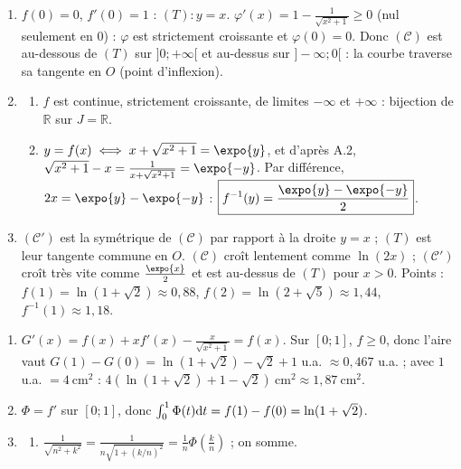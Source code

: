 \begin{corrige}
\begin{sol}
\begin{description}
\begin{enumerate}
\begin{enumerate}
            \end{enumerate}
      \item $f(0) = 0$, $f'(0) = 1$ : $\boxed{(T) : y = x}$. $\varphi'(x) = 1 - \frac{1}{\sqrt{x^2+1}} \geq 0$ (nul seulement en $0$) :
            $\varphi$ est strictement croissante et $\varphi(0) = 0$. Donc $(\mathscr{C})$ est au-dessous de $(T)$ sur $]0 ; +\infty[$ et
            au-dessus sur $]-\infty ; 0[$ : la courbe traverse sa tangente en $O$ (point d'inflexion).
      \item \begin{enumerate}
            \item $f$ est continue, strictement croissante, de limites $-\infty$ et $+\infty$ : bijection de $\mathbb{R}$ sur $\boxed{J = \mathbb{R}}$.
            \item $y = f(x) \iff x + \sqrt{x^2+1} = \expo{y}$, et d'apr\`es A.2, $\sqrt{x^2+1} - x = \frac{1}{x + \sqrt{x^2+1}} = \expo{-y}$.
                  Par diff\'erence, $2x = \expo{y} - \expo{-y}$ : $\boxed{f^{-1}(y) = \frac{\expo{y} - \expo{-y}}{2}}$.
            \end{enumerate}
      \item $(\mathscr{C}')$ est la sym\'etrique de $(\mathscr{C})$ par rapport \`a la droite $y = x$ ; $(T)$ est leur tangente commune
            en $O$. $(\mathscr{C})$ cro\^it lentement comme $\ln(2x)$ ; $(\mathscr{C}')$ cro\^it tr\`es vite comme $\frac{\expo{x}}{2}$ et
            est au-dessus de $(T)$ pour $x > 0$. Points : $f(1) = \ln(1 + \sqrt{2}) \approx 0{,}88$, $f(2) = \ln(2 + \sqrt{5}) \approx 1{,}44$,
            $f^{-1}(1) \approx 1{,}18$.
      \end{enumerate}
\item[Partie B.] \begin{enumerate}
      \item $G'(x) = f(x) + x f'(x) - \frac{x}{\sqrt{x^2+1}} = f(x)$. Sur $[0 ; 1]$, $f \geq 0$, donc l'aire vaut
            $G(1) - G(0) = \ln(1 + \sqrt{2}) - \sqrt{2} + 1$ u.a. $\approx 0{,}467$ u.a. ; avec $1$ u.a. $= 4~\text{cm}^2$ :
            $\boxed{4\left( \ln(1 + \sqrt{2}) + 1 - \sqrt{2} \right)~\text{cm}^2 \approx 1{,}87~\text{cm}^2}$.
      \item $\Phi = f'$ sur $[0 ; 1]$, donc $\int_0^1 \Phi(t)\mathrm{d}t = f(1) - f(0) = \ln(1 + \sqrt{2})$.
      \item \begin{enumerate}
            \item $\frac{1}{\sqrt{n^2 + k^2}} = \frac{1}{n\sqrt{1 + (k/n)^2}} = \frac{1}{n}\Phi\left( \frac{k}{n} \right)$ ; on somme.

\end{enumerate}
\end{enumerate}
\end{description}
\end{sol}
\end{corrige}
